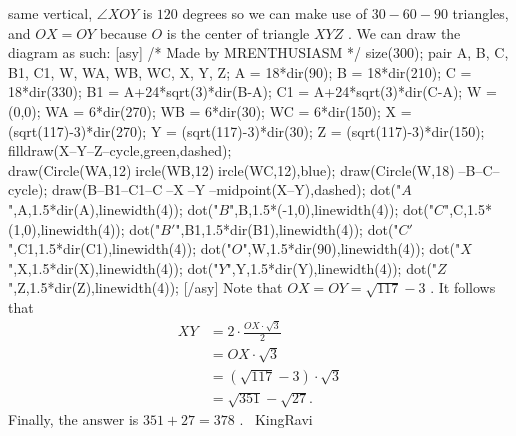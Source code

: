 \documentclass[12pt]{article}
\begin{document}
same vertical, $\angle XOY$ is $120$ degrees so we can make use of $30-60-90$ triangles, and $OX = OY$ because $O$ is the center of triangle $XYZ$ . We can draw the diagram as such: [asy] /* Made by MRENTHUSIASM */ size(300); pair A, B, C, B1, C1, W, WA, WB, WC, X, Y, Z; A = 18*dir(90); B = 18*dir(210); C = 18*dir(330); B1 = A+24*sqrt(3)*dir(B-A); C1 = A+24*sqrt(3)*dir(C-A); W = (0,0); WA = 6*dir(270); WB = 6*dir(30); WC = 6*dir(150); X = (sqrt(117)-3)*dir(270); Y = (sqrt(117)-3)*dir(30); Z = (sqrt(117)-3)*dir(150); filldraw(X--Y--Z--cycle,green,dashed); draw(Circle(WA,12)^^Circle(WB,12)^^Circle(WC,12),blue); draw(Circle(W,18)^^A--B--C--cycle); draw(B--B1--C1--C^^W--X^^W--Y^^W--midpoint(X--Y),dashed); dot("$A$",A,1.5*dir(A),linewidth(4)); dot("$B$",B,1.5*(-1,0),linewidth(4)); dot("$C$",C,1.5*(1,0),linewidth(4)); dot("$B'$",B1,1.5*dir(B1),linewidth(4)); dot("$C'$",C1,1.5*dir(C1),linewidth(4)); dot("$O$",W,1.5*dir(90),linewidth(4)); dot("$X$",X,1.5*dir(X),linewidth(4)); dot("$Y$",Y,1.5*dir(Y),linewidth(4)); dot("$Z$",Z,1.5*dir(Z),linewidth(4)); [/asy] Note that $OX = OY = \sqrt{117} - 3$ . It follows that \begin{align*} XY &= 2 \cdot \frac{OX\cdot\sqrt{3}}{2} \\ &= OX \cdot \sqrt{3} \\ &= (\sqrt{117}-3) \cdot \sqrt{3} \\ &= \sqrt{351}-\sqrt{27}. \end{align*} Finally, the answer is $351+27 = \boxed{378}$ . ~KingRavi
\end{document}
